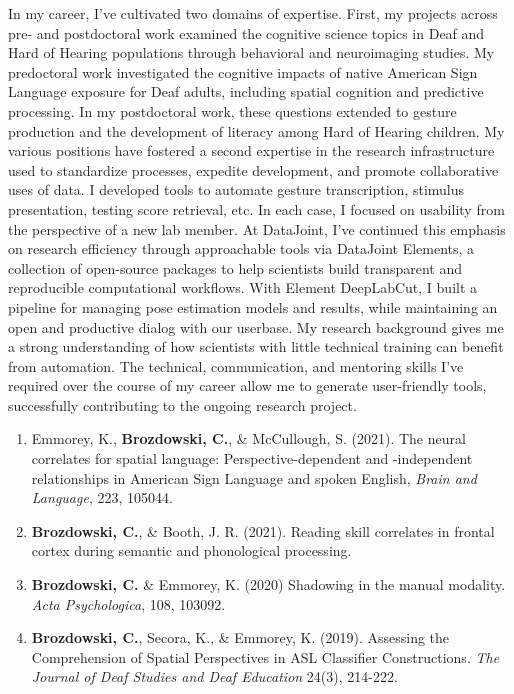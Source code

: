 \documentclass{nihbiosketch}
\begin{document}
\begin{statement}
In my career, I've cultivated two domains of expertise. First, my projects across pre-
and postdoctoral work examined the cognitive science topics in Deaf and Hard of
Hearing populations through behavioral and neuroimaging studies. My
predoctoral work investigated the cognitive impacts of native American Sign Language
exposure for Deaf adults, including spatial cognition and predictive processing. In my
postdoctoral work, these questions extended to gesture production and the development of
literacy among Hard of Hearing children.
My various positions have fostered a second expertise in the research
infrastructure used to standardize processes, expedite development, and promote
collaborative uses of data. I developed tools to automate gesture transcription, stimulus
presentation, testing score retrieval, etc. In each case, I focused on 
usability from the perspective of a new lab member. At DataJoint, I've
continued this emphasis on research efficiency through approachable tools via 
DataJoint Elements, a collection of open-source packages to help scientists build
transparent and reproducible computational workflows. With Element DeepLabCut, I
built a pipeline for managing pose estimation models and results, while
maintaining an open and productive dialog with our userbase. My research background
gives me a strong understanding of how scientists with little technical training can
benefit from automation. The technical, communication, and mentoring skills I've required
over the course of my career allow me to generate user-friendly tools, successfully
contributing to the ongoing research project.

\begin{enumerate}

\item Emmorey, K., \textbf{Brozdowski, C.}, \& McCullough, S. (2021). The neural
        correlates for spatial language: Perspective-dependent and -independent
        relationships in American Sign Language and spoken English,
        \textit{Brain and Language}, 223, 105044.

\item \textbf{Brozdowski, C.}, \& Booth, J. R. (2021). Reading skill correlates in
        frontal cortex during semantic and phonological processing.

\item \textbf{Brozdowski, C.} \& Emmorey, K. (2020) Shadowing in the manual modality.
        \textit{Acta Psychologica}, 108, 103092.

\item \textbf{Brozdowski, C.}, Secora, K., \& Emmorey, K. (2019). Assessing the
        Comprehension of Spatial Perspectives in ASL Classifier Constructions.
        \textit{The Journal of Deaf Studies and Deaf Education} 24(3), 214-222.

\end{enumerate}

\end{statement}
\end{document}
